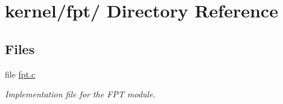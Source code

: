 \hypertarget{dir_000019}{
\section{kernel/fpt/ Directory Reference}
\label{dir_000019}
}
\subsection*{Files}
\begin{CompactItemize}
\item 
file \hyperlink{fpt_8c}{fpt.c}
\begin{CompactList}\small\item\em Implementation file for the FPT module. \item\end{CompactList}

\end{CompactItemize}
